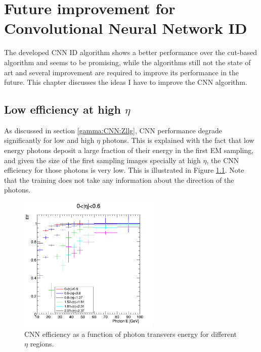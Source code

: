 \chapter{Future improvement for Convolutional Neural Network ID}
\label{Adx3}
The developed CNN ID algorithm shows a better performance over the cut-based algorithm and seems to be promising, while the algorithms still not the state of art and several improvement are required to improve its performance in the future. This chapter discusses the ideas I have to improve the CNN algorithm.

\section{Low efficiency at high $\eta$}
\label{Adx3:Eta}

As discussed in section \ref{gamma:CNN:Zllg}, CNN performance degrade significantly for low \pT and high $\eta$ photons. This is explained with the fact that low energy photons deposit a large fraction of their energy in the first EM sampling, and given the size of the first sampling images specially at high $\eta$, the CNN efficiency for those photons is very low. This is illustrated in Figure \ref{fig:Adx3:Eta}. Note that the training does not take any information about the direction of the photons.
\begin{figure}[htbp]
    \centering
    \includegraphics[width=0.6\textwidth]{Adx/Adx3/Img/Eff_vs_Energy.png}
    \begin{tcolorbox}[colback=black!5!white,colframe=white!75!black]
    \caption{CNN efficiency as a function of photon transvers energy for different $\eta$ regions. }
    \label{fig:Adx3:Eta}
    \end{tcolorbox}
    
\end{figure}

